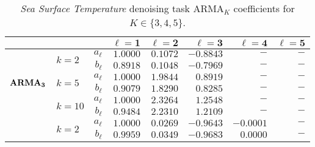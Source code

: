 \documentclass[a4paper, 12pt]{article}
\begin{document}
\begin{table}[ht]
	\centering{}
	\color{blue}
	\caption{\textit{Sea Surface Temperature} denoising task \(\text{ARMA}_K\) coefficients for \(K\in \{ 3,4,5 \} \).}\label{tab:denoise:sst:arma_coeff}
	\begin{tabular}{clrrrrrr}\toprule
		                                                         &                             &            & \(\boldsymbol{\ell=1}\) & \(\boldsymbol{\ell=2}\) & \(\boldsymbol{\ell=3}\) & \(\boldsymbol{\ell=4}\) & \(\boldsymbol{\ell=5}\) \\ \midrule
		                                                         & \multirow{2}{*}{\(k = 2\)}  & \(a_\ell\) & \(1.0000\)              & \(0.1072\)              & \(-0.8843\)             & \( - \)                 & \( - \)                 \\
		                                                         &                             & \(b_\ell\) & \(0.8918\)              & \(0.1048\)              & \(-0.7969\)             & \( - \)                 & \( - \)                 \\ \cmidrule(l){2-8}
		\multirow{2}{*}{\(\boldsymbol{\text{\textbf{ARMA}}_3}\)} & \multirow{2}{*}{\(k = 5\)}  & \(a_\ell\) & \(1.0000\)              & \(1.9844\)              & \(0.8919\)              & \( - \)                 & \( - \)                 \\
		                                                         &                             & \(b_\ell\) & \(0.9079\)              & \(1.8290\)              & \(0.8285\)              & \( - \)                 & \( - \)                 \\ \cmidrule(l){2-8}
		                                                         & \multirow{2}{*}{\(k = 10\)} & \(a_\ell\) & \(1.0000\)              & \(2.3264\)              & \(1.2548\)              & \( - \)                 & \( - \)                 \\
		                                                         &                             & \(b_\ell\) & \(0.9484\)              & \(2.2310\)              & \(1.2109\)              & \( - \)                 & \( - \)                 \\ \midrule
		                                                         & \multirow{2}{*}{\(k = 2\)}  & \(a_\ell\) & \(1.0000\)              & \(0.0269\)              & \(-0.9643\)             & \(-0.0001\)             & \( - \)                 \\
		                                                         &                             & \(b_\ell\) & \(0.9959\)              & \(0.0349\)              & \(-0.9683\)             & \(0.0000\)              & \( - \)                 \\ \cmidrule(l){2-8}

\end{tabular}
\end{table}
\end{document}
